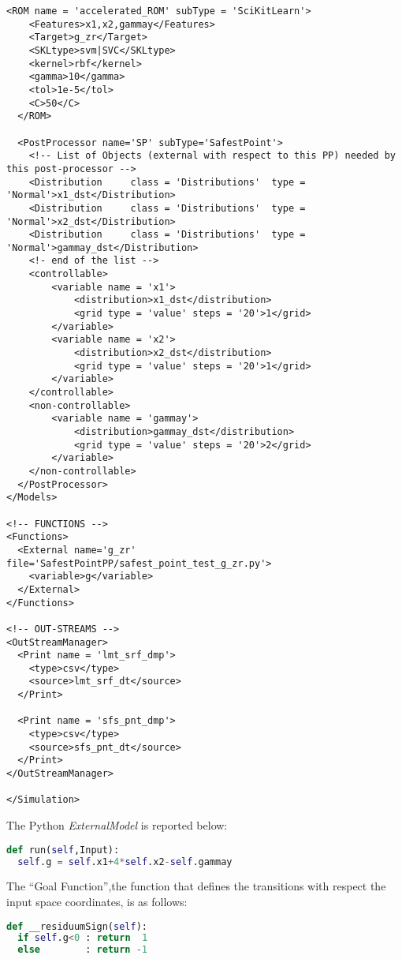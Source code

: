 \begin{lstlisting}[style=XML,morekeywords={debug,re,seeding,class,subType,limit}]
  <ROM name = 'accelerated_ROM' subType = 'SciKitLearn'>
    <Features>x1,x2,gammay</Features>
    <Target>g_zr</Target>
    <SKLtype>svm|SVC</SKLtype>
    <kernel>rbf</kernel>
    <gamma>10</gamma>
    <tol>1e-5</tol>
    <C>50</C>
  </ROM>

  <PostProcessor name='SP' subType='SafestPoint'>
    <!-- List of Objects (external with respect to this PP) needed by this post-processor -->
    <Distribution     class = 'Distributions'  type = 'Normal'>x1_dst</Distribution>
    <Distribution     class = 'Distributions'  type = 'Normal'>x2_dst</Distribution>
    <Distribution     class = 'Distributions'  type = 'Normal'>gammay_dst</Distribution>
    <!- end of the list -->
    <controllable>
    	<variable name = 'x1'>
    		<distribution>x1_dst</distribution>
    		<grid type = 'value' steps = '20'>1</grid>   		
    	</variable>
    	<variable name = 'x2'>
    		<distribution>x2_dst</distribution>
    		<grid type = 'value' steps = '20'>1</grid>   		
    	</variable>
    </controllable>
    <non-controllable>
    	<variable name = 'gammay'>
    		<distribution>gammay_dst</distribution>
    		<grid type = 'value' steps = '20'>2</grid>
    	</variable> 	
    </non-controllable>
  </PostProcessor>
</Models>

<!-- FUNCTIONS -->
<Functions>
  <External name='g_zr' file='SafestPointPP/safest_point_test_g_zr.py'>
    <variable>g</variable>
  </External>
</Functions>

<!-- OUT-STREAMS -->
<OutStreamManager> 
  <Print name = 'lmt_srf_dmp'>
  	<type>csv</type>
  	<source>lmt_srf_dt</source>
  </Print>
  
  <Print name = 'sfs_pnt_dmp'>
  	<type>csv</type>
  	<source>sfs_pnt_dt</source>
  </Print>
</OutStreamManager>

</Simulation>
\end{lstlisting}
The Python \textit{ExternalModel} is reported below:
\begin{lstlisting}[language=python]
def run(self,Input): 
  self.g = self.x1+4*self.x2-self.gammay
\end{lstlisting}
The ``Goal Function'',the function that defines the transitions with respect the input space coordinates, is as follows:
\begin{lstlisting}[language=python]
def __residuumSign(self):
  if self.g<0 : return  1
  else        : return -1
\end{lstlisting}

